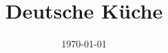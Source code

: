 \documentclass[12pt, a4paper]{article}
\title{Deutsche Küche}
\author{Felsenkatze\and }
\date{\today}
\begin{document}
\onehalfspacing %



\nocite{*}

\blinddocument


\end{document}
